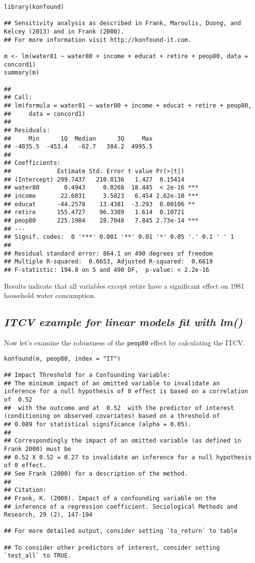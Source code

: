 \documentclass[
]{article}
\begin{document}
\begin{verbatim}
library(konfound)

## Sensitivity analysis as described in Frank, Maroulis, Duong, and Kelcey (2013) and in Frank (2000).
## For more information visit http://konfound-it.com.

m <- lm(water81 ~ water80 + income + educat + retire + peop80, data = concord1)
summary(m)

## 
## Call:
## lm(formula = water81 ~ water80 + income + educat + retire + peop80, 
##     data = concord1)
## 
## Residuals:
##     Min      1Q  Median      3Q     Max 
## -4035.5  -453.4   -62.7   384.2  4995.5 
## 
## Coefficients:
##             Estimate Std. Error t value Pr(>|t|)    
## (Intercept) 299.7437   210.0136   1.427  0.15414    
## water80       0.4943     0.0268  18.445  < 2e-16 ***
## income       22.6031     3.5023   6.454 2.62e-10 ***
## educat      -44.2578    13.4381  -3.293  0.00106 ** 
## retire      155.4727    96.3389   1.614  0.10721    
## peop80      225.1984    28.7048   7.845 2.73e-14 ***
## ---
## Signif. codes:  0 '***' 0.001 '**' 0.01 '*' 0.05 '.' 0.1 ' ' 1
## 
## Residual standard error: 864.1 on 490 degrees of freedom
## Multiple R-squared:  0.6653, Adjusted R-squared:  0.6619 
## F-statistic: 194.8 on 5 and 490 DF,  p-value: < 2.2e-16
\end{verbatim}

Results indicate that all variables except retire have a significant
effect on 1981 household water consumption.

\hypertarget{itcv-example-for-linear-models-fit-with-lm}{%
\subsection{\texorpdfstring{\emph{ITCV example for linear models fit
with
lm()}}{ITCV example for linear models fit with lm()}}\label{itcv-example-for-linear-models-fit-with-lm}}

Now let's examine the robustness of the \texttt{peop80} effect by
calculating the ITCV.

\begin{verbatim}
konfound(m, peop80, index = "IT")

## Impact Threshold for a Confounding Variable:
## The minimum impact of an omitted variable to invalidate an inference for a null hypothesis of 0 effect is based on a correlation of  0.52
##  with the outcome and at  0.52  with the predictor of interest (conditioning on observed covariates) based on a threshold of 
## 0.089 for statistical significance (alpha = 0.05).
## 
## Correspondingly the impact of an omitted variable (as defined in Frank 2000) must be 
## 0.52 X 0.52 = 0.27 to invalidate an inference for a null hypothesis of 0 effect.
## See Frank (2000) for a description of the method.
## 
## Citation:
## Frank, K. (2000). Impact of a confounding variable on the
## inference of a regression coefficient. Sociological Methods and Research, 29 (2), 147-194

## For more detailed output, consider setting `to_return` to table

## To consider other predictors of interest, consider setting `test_all` to TRUE.
\end{verbatim}
\end{document}

